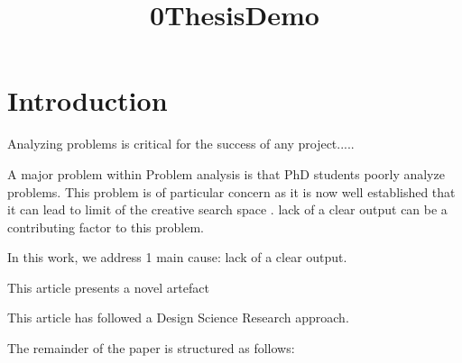 \documentclass{article}
\title{0ThesisDemo}
\author{}
\newcommand{\todo}[1] {\iffalse #1 \fi} %
\begin{document}
\maketitle
      

\section{Introduction}

Analyzing problems is critical for the success of any project.....
    
A major problem within Problem analysis is that PhD students poorly analyze problems. This problem is of particular concern as it is now well established that it can lead to limit of the creative search space \cite{Kokotovich2008}. lack of a clear output can be a contributing factor to this problem. \todo{Is the lack of guidelines a posible cause?}
    

    
In this work, we address 1 main cause: lack of a clear output. 
    
This article presents a novel artefact
    

    

      
This article has followed a Design Science Research approach.

The remainder of the paper is structured as follows: 

    
      


\end{document}
